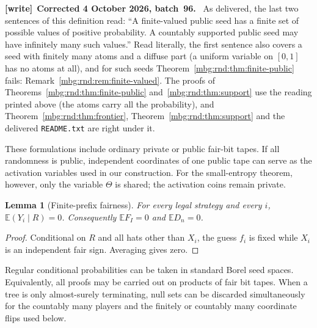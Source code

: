 \documentclass[11pt,letterpaper]{article}
\newtheorem{lemma}[theorem]{Lemma}
\theoremstyle{definition}
\newcommand{\E}{\mathbb E}
\newenvironment{writenote}[1][]{\par\smallskip\begingroup\small
 \noindent\textbf{[write]}\if\relax\detokenize{#1}\relax\else~\textbf{#1.}\fi\ }%
 {\par\endgroup\smallskip}
\begin{document}
\begin{writenote}[Corrected 4 October 2026, batch~96]
As delivered, the last two sentences of this definition read: ``A finite-valued public seed has a finite set of possible values of positive probability. A countably supported public seed may have infinitely many such values.'' Read literally, the first sentence also covers a seed with finitely many atoms and a diffuse part (a uniform variable on $[0,1]$ has no atoms at all), and for such seeds Theorem~\ref{mbg:rnd:thm:finite-public} fails: Remark~\ref{mbg:rnd:rem:finite-valued}. The proofs of Theorems~\ref{mbg:rnd:thm:finite-public} and~\ref{mbg:rnd:thm:support} use the reading printed above (the atoms carry all the probability), and Theorem~\ref{mbg:rnd:thm:frontier}, Theorem~\ref{mbg:rnd:thm:support} and the delivered \texttt{README.txt} are right under it.
\end{writenote}

These formulations include ordinary private or public fair-bit tapes.
If all randomness is public, independent coordinates of one public
tape can serve as the activation variables used in our construction.
For the small-entropy theorem, however, only the variable $\Theta$ is shared;
the activation coins remain private.

\begin{lemma}[Finite-prefix fairness]
\label{mbg:rnd:lem:fairness}
For every legal strategy and every $i$,
$\E(Y_i\mid R)=0$. Consequently $\E F_I=0$ and $\E D_n=0$.
\end{lemma}
\begin{proof}
Conditional on $R$ and all hats other than $X_i$, the guess $f_i$ is
fixed while $X_i$ is an independent fair sign. Averaging gives zero.
\end{proof}

Regular conditional probabilities can be taken in standard Borel seed
spaces. Equivalently, all proofs may be carried out on products of fair
bit tapes. When a tree is only almost-surely terminating, null sets can
be discarded simultaneously for the countably many players and the
finitely or countably many coordinate flips used below.
\end{document}
